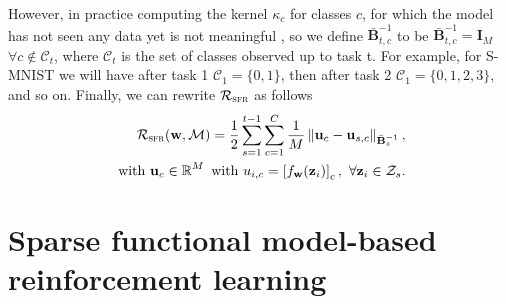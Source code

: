 \documentclass{article}
\newcommand{\our}{\textsc{sfr}\xspace}
\newcommand{\weights}{\ensuremath{\mathbf{w}}}
\newcommand{\mbf}[1]{\mathbf{#1}}
\newcommand{\MB}{\mbf{B}}
\newcommand{\MZ}{\mbf{Z}}
\newcommand{\MI}{\mbf{I}}
\newcommand{\vz}{\mbf{z}}
\newcommand{\vu}{\mbf{u}}
\begin{document}
However, in practice computing the kernel $\kappa_c$ for classes $c$, for which the model has not seen any data yet is not meaningful , so we define $\bar{\MB}^{-1}_{t, c}$ to be  $\bar{\MB}^{-1}_{t, c} = \MI_M$ $\forall c \not\in \mathcal{C}_t$, where $\mathcal{C}_t$ is the set of classes observed up to task t. For example, for S-MNIST  we will have after task 1 $\mathcal{C}_1 = \{0, 1\}$, then after task 2 $\mathcal{C}_1 = \{0, 1, 2, 3\}$, and so on. 
Finally, we can rewrite $\mathcal{R}_\mathrm{\our}$ as follows
\begin{equation}\label{eq-cl-regularizer}\textstyle
\begin{aligned}
  \mathcal{R}_\mathrm{\our}(\weights, \mathcal{M}) = \frac{1}{2} \sum_{s=1}^{t-1} \sum_{c=1}^{C} \frac{1}{M} 
	\left\lVert 
	\vu_c - \vu_{s,c} %
	\right\rVert_{\bar{\MB}^{-1}_{s}}, \\
	\text{~with~} \vu_c \in \R^M \text{~with~} u_{i, c} = \left[ f_{\weights}(\vz_{i}) \right]_c,~\forall {\vz_i} \in \mathcal{Z}_s .
\end{aligned}
\end{equation}




\section{Sparse functional model-based reinforcement learning}
\label{app:rl}
\end{document}
